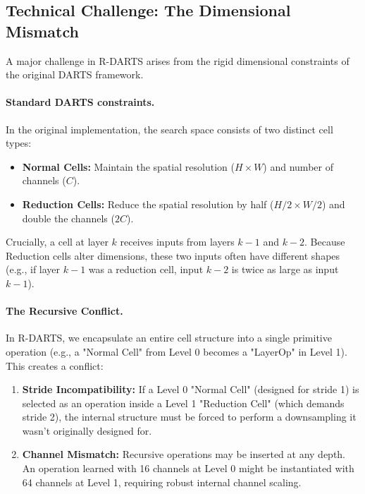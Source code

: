 \documentclass[a4paper,11pt]{article}
\begin{document}
\subsection{Technical Challenge: The Dimensional Mismatch}
A major challenge in R-DARTS arises from the rigid dimensional constraints of the original DARTS framework.

\paragraph{Standard DARTS constraints.}
In the original implementation, the search space consists of two distinct cell types:
\begin{itemize}
    \item \textbf{Normal Cells:} Maintain the spatial resolution ($H \times W$) and number of channels ($C$).
    \item \textbf{Reduction Cells:} Reduce the spatial resolution by half ($H/2 \times W/2$) and double the channels ($2C$).
\end{itemize}
Crucially, a cell at layer $k$ receives inputs from layers $k-1$ and $k-2$. Because Reduction cells alter dimensions, these two inputs often have different shapes (e.g., if layer $k-1$ was a reduction cell, input $k-2$ is twice as large as input $k-1$).

\paragraph{The Recursive Conflict.}
In R-DARTS, we encapsulate an entire cell structure into a single primitive operation (e.g., a "Normal Cell" from Level 0 becomes a "LayerOp" in Level 1). This creates a conflict:
\begin{enumerate}
    \item \textbf{Stride Incompatibility:} If a Level 0 "Normal Cell" (designed for stride 1) is selected as an operation inside a Level 1 "Reduction Cell" (which demands stride 2), the internal structure must be forced to perform a downsampling it wasn't originally designed for.
    \item \textbf{Channel Mismatch:} Recursive operations may be inserted at any depth. An operation learned with 16 channels at Level 0 might be instantiated with 64 channels at Level 1, requiring robust internal channel scaling.
\end{enumerate}
\end{document}
